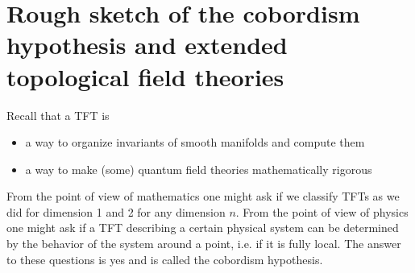 \section{Rough sketch of the cobordism hypothesis and extended topological field theories \extra}\label{sub:outlook_on_the_cobordism_hypothesis_and_extended_topological_field_theories}
 Recall that a TFT is
 \begin{itemize}
\item a way to organize invariants of smooth manifolds and compute them
\item a way to make (some) quantum field theories mathematically rigorous
 \end{itemize} 
 From the point of view of mathematics one might ask if we classify TFTs as we did for dimension 1 and 2 for any dimension $n$. From the point of view of physics one might ask if a TFT describing a certain physical system can be determined by the behavior of the system around a point, i.e. if it is fully local. The answer to these questions is yes and is called the cobordism hypothesis.

